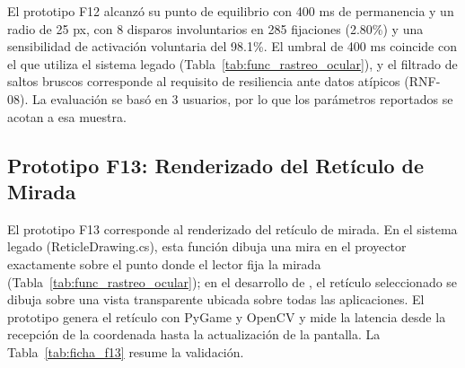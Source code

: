El prototipo F12 alcanzó su punto de equilibrio con 400 ms de permanencia y un radio de 25 px, con 8 disparos involuntarios en 285 fijaciones (2.80\%) y una sensibilidad de activación voluntaria del 98.1\%. El umbral de 400 ms coincide con el que utiliza el sistema legado (Tabla~\ref{tab:func_rastreo_ocular}), y el filtrado de saltos bruscos corresponde al requisito de resiliencia ante datos atípicos (RNF-08). La evaluación se basó en 3 usuarios, por lo que los parámetros reportados se acotan a esa muestra.
 
\subsection{Prototipo F13: Renderizado del Retículo de Mirada}
 
El prototipo F13 corresponde al renderizado del retículo de mirada. En el sistema legado (ReticleDrawing.cs), esta función dibuja una mira en el proyector exactamente sobre el punto donde el lector fija la mirada (Tabla~\ref{tab:func_rastreo_ocular}); en el desarrollo de \cite{estay2020modulo}, el retículo seleccionado se dibuja sobre una vista transparente ubicada sobre todas las aplicaciones. El prototipo genera el retículo con PyGame y OpenCV y mide la latencia desde la recepción de la coordenada hasta la actualización de la pantalla. La Tabla~\ref{tab:ficha_f13} resume la validación.
 
